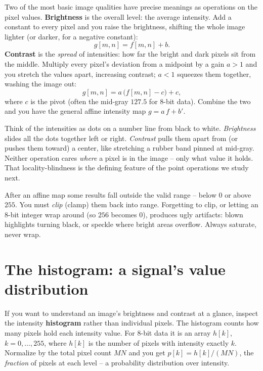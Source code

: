 Two of the most basic image qualities have precise meanings as operations on the
pixel values. \textbf{Brightness} is the overall level: the average intensity.
Add a constant to every pixel and you raise the brightness, shifting the whole
image lighter (or darker, for a negative constant):
\begin{equation}
\label{ch30:brightness}
g[m,n] = f[m,n] + b .
\end{equation}
\textbf{Contrast} is the \emph{spread} of intensities: how far the bright and
dark pixels sit from the middle. Multiply every pixel's deviation from a midpoint
by a gain $a>1$ and you stretch the values apart, increasing contrast; $a<1$
squeezes them together, washing the image out:
\begin{equation}
\label{ch30:contrast}
g[m,n] = a\,\bigl(f[m,n]-c\bigr) + c,
\end{equation}
where $c$ is the pivot (often the mid-gray $127.5$ for 8-bit data). Combine the
two and you have the general affine intensity map $g = a\,f + b'$.

\begin{intuitionbox}
Think of the intensities as dots on a number line from black to white.
\emph{Brightness} slides all the dots together left or right. \emph{Contrast}
pulls them apart from (or pushes them toward) a center, like stretching a rubber
band pinned at mid-gray. Neither operation cares \emph{where} a pixel is in the
image -- only what value it holds. That locality-blindness is the defining
feature of the point operations we study next.
\end{intuitionbox}

\begin{trapbox}
After an affine map some results fall outside the valid range -- below $0$ or
above $255$. You must \emph{clip} (clamp) them back into range. Forgetting to clip,
or letting an 8-bit integer wrap around (so $256$ becomes $0$), produces ugly
artifacts: blown highlights turning black, or speckle where bright areas
overflow. Always saturate, never wrap.
\end{trapbox}

\section{The histogram: a signal's value distribution}
\label{ch30:histogram}

If you want to understand an image's brightness and contrast at a glance, inspect the intensity \textbf{histogram} rather than
individual pixels. The histogram counts how
many pixels hold each intensity value. For 8-bit data it is an array $h[k]$,
$k=0,\dots,255$, where $h[k]$ is the number of pixels with intensity exactly $k$.
Normalize by the total pixel count $MN$ and you get $p[k]=h[k]/(MN)$, the
\emph{fraction} of pixels at each level -- a probability distribution over
intensity.

